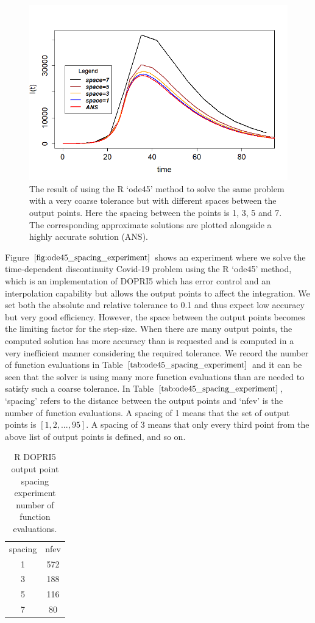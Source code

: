 \begin{figure}[H]
\centering
\includegraphics[width=0.7\linewidth]{./figures/R_ode45_spacing_experiment}
\caption{The result of using the R `ode45' method to solve the same problem with a very coarse tolerance but with different spaces between the output points. Here the spacing between the points is 1, 3, 5 and 7. The corresponding approximate solutions are plotted alongside a highly accurate solution (ANS).}
\label{fig:ode45_spacing_experiment}
\end{figure}

Figure $\ref{fig:ode45_spacing_experiment}$ shows an experiment where we solve the time-dependent discontinuity Covid-19 problem using the R `ode45' method, which is an implementation of DOPRI5 which has error control and an interpolation capability but allows the output points to affect the integration. We set both the absolute and relative tolerance to 0.1 and thus expect low accuracy but very good efficiency. However, the space between the output points becomes the limiting factor for the step-size. When there are many output points, the computed solution has more accuracy than is requested and is computed in a very inefficient manner considering the required tolerance. We record the number of function evaluations in Table $\ref{tab:ode45_spacing_experiment}$ and it can be seen that the solver is using many more function evaluations than are needed to satisfy such a coarse tolerance. In Table $\ref{tab:ode45_spacing_experiment}$, `spacing' refers to the distance between the output points and `nfev' is the number of function evaluations. A spacing of 1 means that the set of output points is $[1, 2, ..., 95]$. A spacing of 3 means that only every third point from the above list of output points is defined, and so on.

\begin{table}[h]
\caption {R DOPRI5 output point spacing experiment number of function evaluations.} \label{tab:ode45_spacing_experiment} 
\begin{center}
\begin{tabular}{ c c }
spacing & nfev \\ 
1 & 572 \\
3 & 188 \\
5 & 116 \\
7 & 80 \\
\end{tabular}
\end{center}
\end{table}

